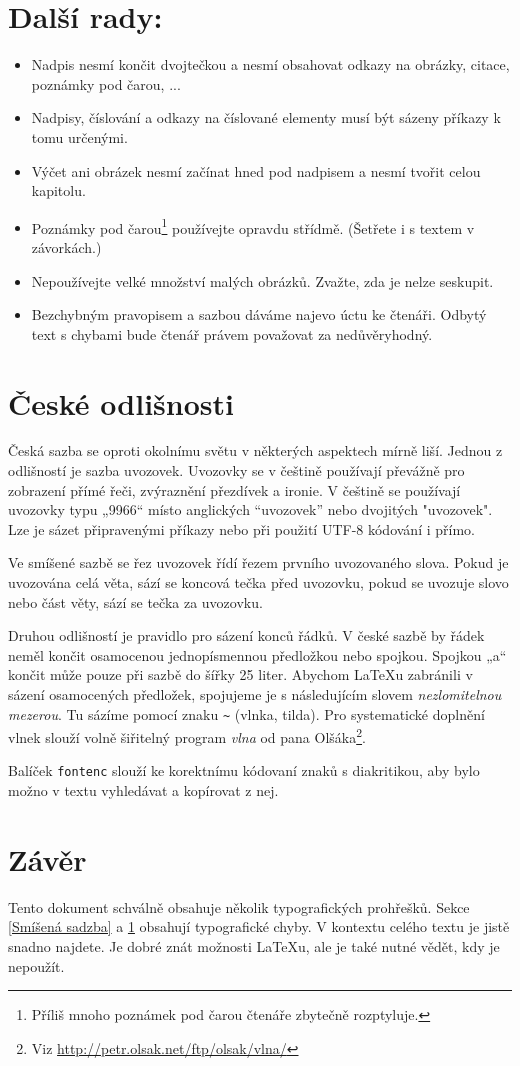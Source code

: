 \documentclass[twocolumn,10pt]{article}
\begin{document}
\section{Další rady:} \label{Další rady:}
\begin{itemize}
	\item Nadpis nesmí končit dvojtečkou a nesmí obsahovat odkazy na obrázky, citace, poznámky pod čarou, ... 
	\item Nadpisy, číslování a odkazy na číslované elementy musí být sázeny příkazy k tomu určenými.
	\item Výčet ani obrázek nesmí začínat hned pod nadpisem a nesmí tvořit celou kapitolu.
	\item Poznámky pod čarou\footnote{Příliš mnoho poznámek pod čarou čtenáře zbytečně rozptyluje.} používejte opravdu střídmě. (Šetřete i s textem v závorkách.)
	\item Nepoužívejte velké množství malých obrázků. Zvažte, zda je nelze seskupit.
	\item Bezchybným pravopisem a sazbou dáváme najevo úctu ke čtenáři. Odbytý text s chybami bude čtenář právem považovat za nedůvěryhodný.
\end{itemize}

\section{České odlišnosti}\label{České odlišnosti}
Česká sazba se oproti okolnímu světu v některých aspektech mírně liší. Jednou z odlišností je sazba uvozovek. Uvozovky se v češtině používají převážně pro zobrazení přímé řeči, zvýraznění přezdívek a ironie. V češtině se používají uvozovky typu „9966“ místo anglických “uvozovek” nebo dvojitých "uvozovek". Lze je sázet připravenými příkazy nebo při použití UTF-8 kódování i přímo.

Ve smíšené sazbě se řez uvozovek řídí řezem prvního uvozovaného slova. Pokud je uvozována celá věta, sází se koncová tečka před uvozovku, pokud se uvozuje slovo nebo část věty, sází se tečka za uvozovku.

Druhou odlišností je pravidlo pro sázení konců řádků. V české sazbě by řádek neměl končit osamocenou jednopísmennou předložkou nebo spojkou. Spojkou „a“ končit může pouze při sazbě do šířky 25 liter. Abychom \LaTeX u zabránili v sázení osamocených předložek, spojujeme je s následujícím slovem \emph{nezlomitelnou mezerou}. Tu sázíme pomocí znaku \verb=~= (vlnka, tilda). Pro systematické doplnění vlnek slouží volně šiřitelný program \emph{vlna} od pana Olšáka\footnote{Viz \url{http://petr.olsak.net/ftp/olsak/vlna/}}.

Balíček \texttt{fontenc} slouží ke korektnímu kódovaní znaků s diakritikou, aby bylo možno v textu vyhledávat a kopírovat z nej.

\section{Závěr}\label{Závěr}
Tento dokument schválně obsahuje několik typografických prohřešků. Sekce \ref{Smíšená sadzba} a \ref{Další rady:} obsahují typografické chyby. V kontextu celého textu je jistě snadno najdete. Je dobré znát možnosti \LaTeX u, ale je také nutné vědět, kdy je nepoužít.
\end{document}
